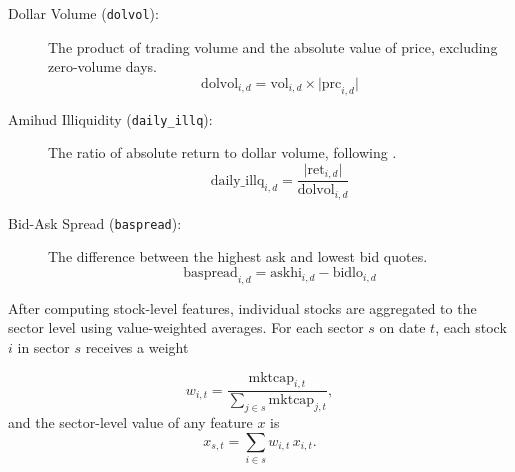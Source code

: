 \begin{description}
    \item[Dollar Volume (\texttt{dolvol}):]  
      The product of trading volume and the absolute value of price, excluding zero-volume days.
      \begin{equation}
      \label{eq:dolvol}
      \text{dolvol}_{i,d} = \text{vol}_{i,d}\times \bigl|\text{prc}_{i,d}\bigr|
      \end{equation}
  
    \item[Amihud Illiquidity (\texttt{daily\_illq}):]  
      The ratio of absolute return to dollar volume, following \cite{Amihud2002}.
      \begin{equation}
      \label{eq:daily_illq}
      \text{daily\_illq}_{i,d}
      = \frac{\bigl|\text{ret}_{i,d}\bigr|}{\text{dolvol}_{i,d}}
      \end{equation}
  
    \item[Bid-Ask Spread (\texttt{baspread}):]  
      The difference between the highest ask and lowest bid quotes.
      \begin{equation}
      \label{eq:baspread}
      \text{baspread}_{i,d} = \text{askhi}_{i,d} - \text{bidlo}_{i,d}
      \end{equation}
  
      
  \end{description}
  
  After computing stock-level features, individual stocks are aggregated to the sector level using value-weighted averages. For each sector \(s\) on date \(t\), each stock \(i\) in sector \(s\) receives a weight 
  
  \begin{equation}
  \label{eq:sect_aggr}
  w_{i,t} = \frac{\mathrm{mktcap}_{i,t}}{\sum_{j\in s}\mathrm{mktcap}_{j,t}},
  \end{equation}
  and the sector-level value of any feature \(x\) is  
  \begin{equation}
  \label{eq:sector_level}
  x_{s,t} = \sum_{i\in s} w_{i,t}\,x_{i,t}.
  \end{equation}

